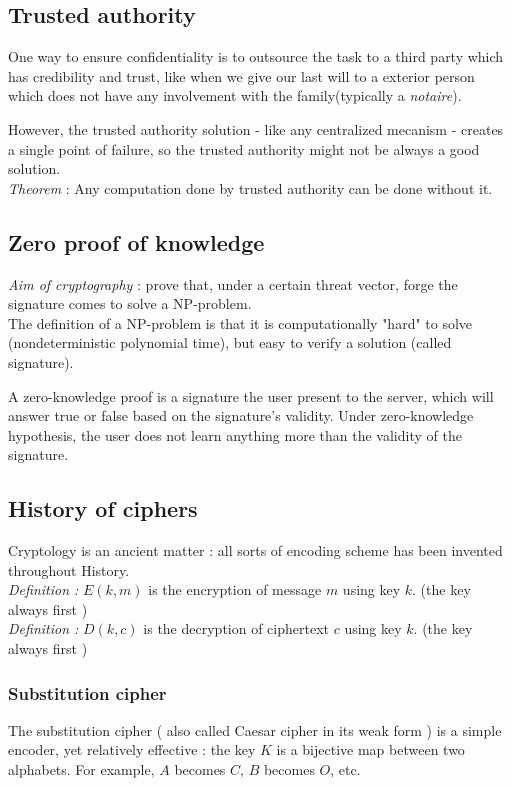 \subsection{Trusted authority}

One way to ensure confidentiality is to outsource the task to a third party which has credibility and trust, like when we give our last will to a exterior person which does not have any involvement with the family(typically a \emph{notaire}).

However, the trusted authority solution - like any centralized mecanism -  creates a single point of failure, so the trusted authority might not be always a good solution. \\

\emph{Theorem} : Any computation done by trusted authority can be done without it.\\


\subsection{ Zero proof of knowledge }

\textit{Aim of cryptography} : prove that, under a certain threat vector, forge the signature comes to solve a NP-problem. \\

The definition of a NP-problem is that it is computationally "hard" to solve (nondeterministic polynomial time), but easy to verify a solution (called signature).

A zero-knowledge proof is a signature the user present to the server, which will answer true or false based on the signature's validity. Under zero-knowledge hypothesis, the user does not learn anything more than the validity of the signature.

\subsection{History of ciphers}

Cryptology is an ancient matter : all sorts of encoding scheme has been invented throughout History. \\


\emph{Definition :} $E(k,m)$ is the encryption of message $m$ using key $k$. (the key always first ) \\
\emph{Definition :} $D(k,c)$ is the decryption of ciphertext $c$ using key $k$. (the key always first ) 

\subsubsection{Substitution cipher }
The substitution cipher ( also called Caesar cipher in its weak form ) is a simple encoder, yet relatively effective : the key $K$ is a bijective map between two alphabets. For example, $A$ becomes $C$, $B$ becomes $O$, etc.\\

